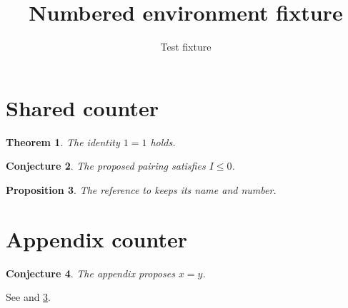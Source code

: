 \documentclass[11pt,letterpaper]{article}
\title{Numbered environment fixture}
\author{Test fixture}
\date{}
\newtheorem{theorem}{Theorem}[section]
\newtheorem{conjecture}[theorem]{Conjecture}
\newtheorem{proposition}[theorem]{Proposition}
\begin{document}
\maketitle
\section{Shared counter}
\begin{theorem}\label{thm:first}
The identity $1=1$ holds.
\end{theorem}
\begin{conjecture}\label{conj:middle}
The proposed pairing satisfies $I\leq 0$.
\end{conjecture}
\begin{proposition}\label{prop:last}
The reference to  keeps its name and number.
\end{proposition}
\appendix
\section{Appendix counter}
\begin{conjecture}\label{conj:appendix}
The appendix proposes $x=y$.
\end{conjecture}
See  and \ref{prop:last}.
\end{document}
